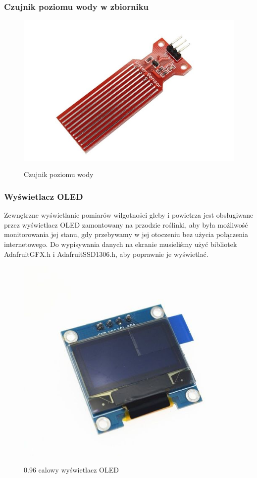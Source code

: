 \documentclass[12pt]{article}
\begin{document}
\subsubsection{Czujnik poziomu wody w zbiorniku}

\begin{figure}[!h]
	\begin{center}
		{\includegraphics[width=12cm]{water_sensor_photo.png}}
	\end{center}
	\caption{Czujnik poziomu wody}
\end{figure}

\subsubsection{Wyświetlacz OLED}
Zewnętrzne wyświetlanie pomiarów wilgotności gleby i powietrza jest obsługiwane przez wyświetlacz OLED zamontowany na przodzie roślinki, aby była możliwość monitorowania jej stanu, gdy przebywamy w jej otoczeniu bez użycia połączenia internetowego. Do wypisywania danych na ekranie musieliśmy użyć bibliotek AdafruitGFX.h i  AdafruitSSD1306.h, aby poprawnie je wyświetlać. 

\begin{figure}[!h]
	\begin{center}
		{\includegraphics[width=12cm]{oled-display_photo.png}}
	\end{center}
	\caption{0.96 calowy wyświetlacz OLED}
\end{figure}
\end{document}
